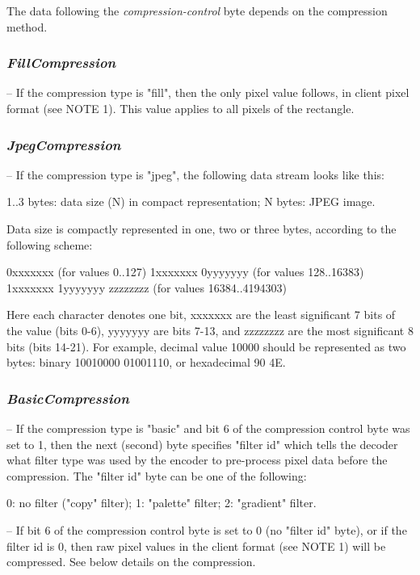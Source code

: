 \documentclass[a4paper]{article}
\newcommand{\typestr}[1]{\textit{#1}}
\newcommand{\literal}[1]{\textit{\textbf{#1}}}
\begin{document}
The data following the \typestr{compression-control} byte depends on
the compression method.

\subsubsection*{\literal{FillCompression}}

-- If the compression type is "fill", then the only pixel value follows, in
 client pixel format (see NOTE 1). This value applies to all pixels of the
 rectangle.

\subsubsection*{\literal{JpegCompression}}

-- If the compression type is "jpeg", the following data stream looks like
 this:

   1..3 bytes:  data size (N) in compact representation;
   N bytes:     JPEG image.

 Data size is compactly represented in one, two or three bytes, according
 to the following scheme:

  0xxxxxxx                    (for values 0..127)
  1xxxxxxx 0yyyyyyy           (for values 128..16383)
  1xxxxxxx 1yyyyyyy zzzzzzzz  (for values 16384..4194303)

 Here each character denotes one bit, xxxxxxx are the least significant 7
 bits of the value (bits 0-6), yyyyyyy are bits 7-13, and zzzzzzzz are the
 most significant 8 bits (bits 14-21). For example, decimal value 10000
 should be represented as two bytes: binary 10010000 01001110, or
 hexadecimal 90 4E.

\subsubsection*{\literal{BasicCompression}}

-- If the compression type is "basic" and bit 6 of the compression control
 byte was set to 1, then the next (second) byte specifies "filter id" which
 tells the decoder what filter type was used by the encoder to pre-process
 pixel data before the compression. The "filter id" byte can be one of the
 following:

   0:  no filter ("copy" filter);
   1:  "palette" filter;
   2:  "gradient" filter.

-- If bit 6 of the compression control byte is set to 0 (no "filter id"
 byte), or if the filter id is 0, then raw pixel values in the client
 format (see NOTE 1) will be compressed. See below details on the
 compression.
\end{document}
